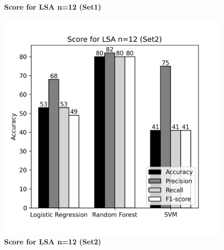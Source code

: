 \documentclass[12pt]{report}
\begin{document}
\begin{figure}[!htb]
\begin{minipage}{0.48\textwidth}
                  \caption{\textbf{Score for LSA n=12 (Set1)}}\label{Fig:typo2}
                \end{minipage}
             \end{figure}

             \begin{figure}[!htb]
                \begin{minipage}{0.48\textwidth}
                  \centering
                  \includegraphics[scale=0.55]{plots/Score for LSA n=12 (Set2).png}
                  \caption{\textbf{Score for LSA n=12 (Set2)}}\label{Fig:typo1}
                \end{minipage}\hfill
                \begin{minipage}{0.48\textwidth}
                  \centering

\end{minipage}
\end{figure}
\end{document}
